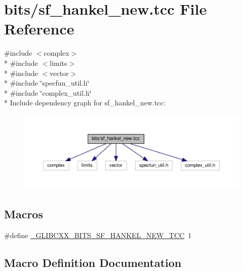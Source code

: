 \hypertarget{sf__hankel__new_8tcc}{}\section{bits/sf\+\_\+hankel\+\_\+new.tcc File Reference}
\label{sf__hankel__new_8tcc}
{\ttfamily \#include $<$complex$>$}\\*
{\ttfamily \#include $<$limits$>$}\\*
{\ttfamily \#include $<$vector$>$}\\*
{\ttfamily \#include \char`\"{}specfun\+\_\+util.\+h\char`\"{}}\\*
{\ttfamily \#include \char`\"{}complex\+\_\+util.\+h\char`\"{}}\\*
Include dependency graph for sf\+\_\+hankel\+\_\+new.\+tcc\+:
\nopagebreak
\begin{figure}[H]
\begin{center}
\leavevmode
\includegraphics[width=350pt]{sf__hankel__new_8tcc__incl}
\end{center}
\end{figure}
\subsection*{Macros}
\begin{DoxyCompactItemize}
\item 
\#define \hyperlink{sf__hankel__new_8tcc_a3f0d94d8fb94ad2e003fd0b54ce51a6d}{\+\_\+\+G\+L\+I\+B\+C\+X\+X\+\_\+\+B\+I\+T\+S\+\_\+\+S\+F\+\_\+\+H\+A\+N\+K\+E\+L\+\_\+\+N\+E\+W\+\_\+\+T\+CC}~1
\end{DoxyCompactItemize}


\subsection{Macro Definition Documentation}
